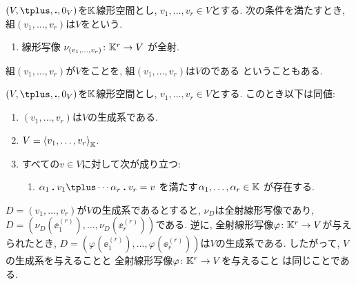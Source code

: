 \begin{definition}
  $(V,\plus,\act,0_V)$を$\mathbb{K}$線形空間とし,
  $v_1,\ldots,v_r\in V$とする.
  次の条件を満たすとき,
  組$(v_1,\ldots,v_r)$は$V$をという.
  \begin{enumerate}
  \item 線形写像 $\nu_{(v_1,\ldots,v_r)}\colon \mathbb{K}^r \to V$
    が全射.
  \end{enumerate}
  組$(v_1,\ldots,v_r)$が$V$をことを,
  組$(v_1,\ldots,v_r)$は$V$のである
  ということもある.
\end{definition}
\begin{prop}
  $(V,\plus,\act,0_V)$を$\mathbb{K}$線形空間とし,
  $v_1,\ldots,v_r\in V$とする.
  このとき以下は同値:
  \begin{enumerate}
  \item $(v_1,\ldots,v_r)$は$V$の生成系である.
  \item $V=\Braket{v_1,\ldots,v_r}_{\mathbb{K}}$.
  \item
    すべての$v\in V$に対して次が成り立つ:
    \begin{enumerate}
    \item
    $\alpha_1\act v_1\plus \cdots \alpha_r\act v_r=v$
    を満たす$\alpha_1,\ldots,\alpha_r\in\mathbb{K}$ が存在する.
    \end{enumerate}
  \end{enumerate}
\end{prop}
\begin{remark}
  $D=(v_1,\ldots,v_r)$が$V$の生成系であるとすると,
  $\nu_D$は全射線形写像であり,
  $D=(\nu_D(\ee^{(r)}_1),\ldots,\nu_D(\ee^{(r)}_r))$である.
  逆に, 全射線形写像$\varphi\colon \mathbb{K}^r\to V$が与えられたとき,
  $D=(\varphi(\ee^{(r)}_1),\ldots,\varphi(\ee^{(r)}_r))$は$V$の生成系である.
  したがって,
  $V$の生成系を与えることと
  全射線形写像$\varphi\colon \mathbb{K}^r\to V$を与えること
  は同じことである.
\end{remark}




